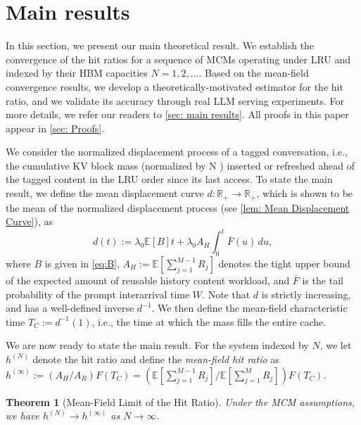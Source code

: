 \documentclass{article}
\newtheorem{theorem}{Theorem}[section]
\theoremstyle{definition}
\newcommand{\E}{\mathbb E}
\newcommand{\chutong}[1]{[\textcolor{red}{Chutong: #1}]}
\begin{document}
\section{Main results}
\label{sec: main results-short}
\vspace{-0.5em}
\vspace{-0.2em}

In this section, we present our main theoretical result. We establish the convergence of the hit ratios for a sequence of MCMs operating under LRU and indexed by their HBM capacities $N = 1, 2, \ldots$. Based on the mean-field convergence results, we develop a theoretically-motivated estimator for the hit ratio, and we validate its accuracy through real LLM serving experiments. 
For more details, we refer our readers to \cref{sec: main results}. All proofs in this paper appear in \cref{sec: Proofs}.

We consider the normalized displacement process of a tagged conversation, i.e., the cumulative KV block mass (normalized by N ) inserted or refreshed ahead of the tagged content in the LRU order since its last access. To state the main result,  we define the mean displacement curve $d:\mathbb R_+  \rightarrow \mathbb R_+$, which is shown to be the mean of the normalized displacement process (see \cref{lem: Mean Displacement Curve}), as
\begin{equation}
d(t):=\lambda_0\E[B]t+\lambda_0A_H\int_0^t\bar F(u)\,du,
\end{equation}
where $B$ is given in \eqref{eq:B}, $A_H:=\E[\sum_{j=1}^{M-1} R_j]$ denotes the tight upper bound of the expected amount of reusable history content workload, and $\bar{F}$ is the tail probability of the prompt interarrival time $W$.
Note that $d$ is strictly increasing, and has a well-defined inverse $d^{-1}$. We then define the mean-field characteristic time $T_C:=d^{-1}(1)$, i.e., the time at which the mass fills the entire cache.

We are now ready to state the main result. For the system indexed by $N$, we let $h^{(N)}$ denote the  hit ratio and define the \textit{mean-field hit ratio} as $h ^{(\infty)} :=(A_H/{A_R})F(T_C) = (\E[\sum_{j=1}^{M-1} R_j] / \E [\sum_{j=1}^{M} R_j]) F(T_C)$. %

\begin{theorem}[Mean-Field Limit of the Hit Ratio]
    \label{thm: Hit Ratio Convergence in the MCM-LRU model- Short-short}
    Under the MCM assumptions, we have $h ^{(N)}\rightarrow h ^{(\infty)}$ as $N\rightarrow \infty.$
\end{theorem}
\vspace{-0.5em}
\vspace{-0.3em}
\end{document}
